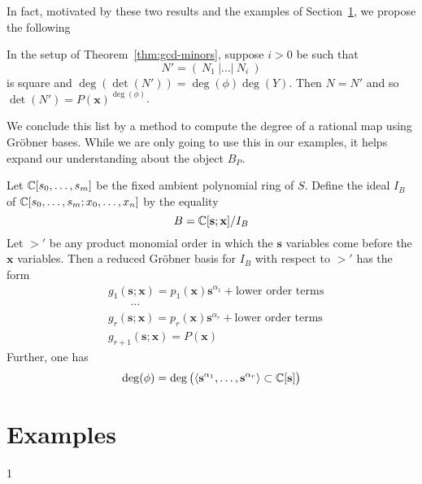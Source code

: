 \documentclass[fleqn,reqno]{amsart}
\begin{document}
\begin{paragraf*}
In fact, motivated by these two results and the examples of Section~\ref{sec:examples},
we propose the following
\end{paragraf*}

\begin{conjecture}
In the setup of Theorem~\ref{thm:gcd-minors}, suppose $i>0$ be such that
\[
	N'=(~N_1~|\ldots|~N_i~)
\]
is square and $\deg(\det(N'))=\deg(\phi)\deg(Y)$.
Then $N=N'$ and so $\det(N')=P(\mathbf x)^{\deg(\phi)}$.
\end{conjecture}

\begin{paragraf*}
We conclude this list by a method to compute the degree of a rational map using Gr\"{o}bner bases.
While we are only going to use this in our examples,
it helps expand our understanding about the object $B_P$.
\end{paragraf*}

\begin{proposition}
\label{prop:deg-GB}
Let $\mathbb{C}[s_0,\ldots,s_m]$ be the fixed ambient polynomial ring of $S$.
Define the ideal $I_B$ of $\mathbb{C}[s_0,\ldots,s_m;x_0,\ldots,x_n]$ by the equality
\[
	B=\mathbb{C}[\mathbf s;\mathbf x]/I_B
\]
Let $>'$ be any product monomial order in which the $\mathbf s$ variables
come before the $\mathbf x$ variables.
Then a reduced Gr\"obner basis for $I_B$ with respect to $>'$ has the form
\begin{align*}
	&g_1(\mathbf s;\mathbf x)=p_1(\mathbf x){\mathbf s}^{\alpha_1}+\text{lower order terms}\\
	&\qquad\cdots\\
	&g_r(\mathbf s;\mathbf x)=p_r(\mathbf x){\mathbf s}^{\alpha_r}+\text{lower order terms}\\
	&g_{r+1}(\mathbf s;\mathbf x)=P(\mathbf x)
\end{align*}
Further, one has
\[
	\deg(\phi)=
	\deg \big(\langle{\mathbf s}^{\alpha_1},\ldots,{\mathbf s}^{\alpha_r}\rangle\subset\mathbb{C}[\mathbf s]\big)
\]
\end{proposition}





\section{Examples}
\label{sec:examples}

\begin{paragraph*}
	1
\end{paragraph*}
\end{document}
